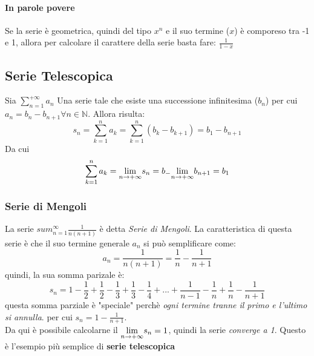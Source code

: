 \documentclass[12pt, a4paper, openany]{book}
\begin{document}

	\paragraph{In parole povere}
	Se la serie è geometrica, quindi del tipo $x^n$ e il suo termine ($x$) è comporeso tra -1 e 1, allora per calcolare il carattere della serie basta fare: $\frac{1}{1-x}$
	\\
	\subsection{Serie Telescopica}
	Sia $\sum_{n=1}^{+\infty} a_n$ Una serie tale che esiste una successione infinitesima ($b_n$) per cui $a_n = b_n - b_{n+1} \forall n\in \mathbb{N}$.
	Allora risulta:
	\begin{equation*}
		s_n = \sum_{k=1}^{n}a_k = \sum_{k=1}^n (b_k - b_{k+1}) = b_1 - b_{n+1}
	\end{equation*}
	Da cui
	\begin{equation*}
		\sum_{k=1}^{n}a_k = \underset{n \to +\infty}{\lim} s_n = b_ - \underset{n \to +\infty}{\lim} b_{n+1} = b_1
	\end{equation*}

	\subsubsection*{Serie di Mengoli}
	La serie $sum_{n=1}^\infty \frac{1}{n(n+1)}$ è detta \emph{Serie di Mengoli}.
	La caratteristica di questa serie è che il suo termine generale $a_n$ si può semplificare come:
	\begin{equation*}
		a_n = \frac{1}{n(n+1)} = \frac{1}{n} - \frac{1}{n+1}
	\end{equation*}
	quindi, la sua somma parizale è:
	\begin{equation*}
		s_n = 1 - \frac{1}{2} + \frac{1}{2} - \frac{1}{3} +  \frac{1}{3} - \frac{1}{4} + ... +  \frac{1}{n-1} - \frac{1}{n} +  \frac{1}{n} - \frac{1}{n+1}
	\end{equation*}
	questa somma parziale è "speciale" perchè \emph{ogni termine tranne il primo e l'ultimo si annulla}. per cui $s_n = 1 - \frac{1}{n+1}$.
	\\Da qui è possibile calcolarne il $\underset{n \to +\infty}{\lim} s_n = 1$, quindi la serie \emph{converge a 1}.
	Questo è l'esempio più semplice di \textbf{serie telescopica}
\end{document}

